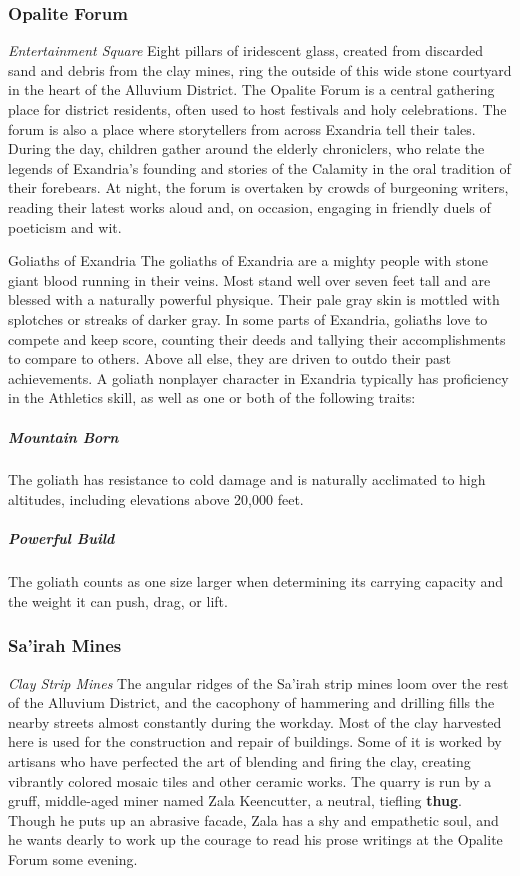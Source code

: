 \documentclass[10pt,a4,twoside,twocolumn,openany,nodeprecatedcode]{dndbook}
\begin{document}
\subsubsection{Opalite Forum}
\textit{Entertainment Square}
Eight pillars of iridescent glass, created from discarded sand and debris from the clay mines, ring the outside of this wide stone courtyard in the heart of the Alluvium District. The Opalite Forum is a central gathering place for district residents, often used to host festivals and holy celebrations.
The forum is also a place where storytellers from across Exandria tell their tales. During the day, children gather around the elderly chroniclers, who relate the legends of Exandria's founding and stories of the Calamity in the oral tradition of their forebears. At night, the forum is overtaken by crowds of burgeoning writers, reading their latest works aloud and, on occasion, engaging in friendly duels of poeticism and wit.
\begin{DndComment}{Goliaths of Exandria}
The goliaths of Exandria are a mighty people with stone giant blood running in their veins. Most stand well over seven feet tall and are blessed with a naturally powerful physique. Their pale gray skin is mottled with splotches or streaks of darker gray.
In some parts of Exandria, goliaths love to compete and keep score, counting their deeds and tallying their accomplishments to compare to others. Above all else, they are driven to outdo their past achievements.
A goliath nonplayer character in Exandria typically has proficiency in the Athletics skill, as well as one or both of the following traits:
\subparagraph{Mountain Born}
The goliath has resistance to cold damage and is naturally acclimated to high altitudes, including elevations above 20,000 feet.
\subparagraph{Powerful Build}
The goliath counts as one size larger when determining its carrying capacity and the weight it can push, drag, or lift.
\end{DndComment}

\subsubsection{Sa'irah Mines}
\textit{Clay Strip Mines}
The angular ridges of the Sa'irah strip mines loom over the rest of the Alluvium District, and the cacophony of hammering and drilling fills the nearby streets almost constantly during the workday. Most of the clay harvested here is used for the construction and repair of buildings. Some of it is worked by artisans who have perfected the art of blending and firing the clay, creating vibrantly colored mosaic tiles and other ceramic works.
The quarry is run by a gruff, middle-aged miner named Zala Keencutter, a neutral, tiefling \textbf{thug}. Though he puts up an abrasive facade, Zala has a shy and empathetic soul, and he wants dearly to work up the courage to read his prose writings at the Opalite Forum some evening.
\end{document}

